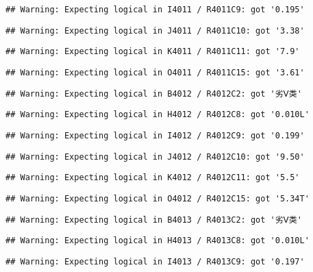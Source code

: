 \documentclass[
]{article}
\begin{document}
\begin{verbatim}
## Warning: Expecting logical in I4011 / R4011C9: got '0.195'
\end{verbatim}

\begin{verbatim}
## Warning: Expecting logical in J4011 / R4011C10: got '3.38'
\end{verbatim}

\begin{verbatim}
## Warning: Expecting logical in K4011 / R4011C11: got '7.9'
\end{verbatim}

\begin{verbatim}
## Warning: Expecting logical in O4011 / R4011C15: got '3.61'
\end{verbatim}

\begin{verbatim}
## Warning: Expecting logical in B4012 / R4012C2: got '劣Ⅴ类'
\end{verbatim}

\begin{verbatim}
## Warning: Expecting logical in H4012 / R4012C8: got '0.010L'
\end{verbatim}

\begin{verbatim}
## Warning: Expecting logical in I4012 / R4012C9: got '0.199'
\end{verbatim}

\begin{verbatim}
## Warning: Expecting logical in J4012 / R4012C10: got '9.50'
\end{verbatim}

\begin{verbatim}
## Warning: Expecting logical in K4012 / R4012C11: got '5.5'
\end{verbatim}

\begin{verbatim}
## Warning: Expecting logical in O4012 / R4012C15: got '5.34T'
\end{verbatim}

\begin{verbatim}
## Warning: Expecting logical in B4013 / R4013C2: got '劣Ⅴ类'
\end{verbatim}

\begin{verbatim}
## Warning: Expecting logical in H4013 / R4013C8: got '0.010L'
\end{verbatim}

\begin{verbatim}
## Warning: Expecting logical in I4013 / R4013C9: got '0.197'
\end{verbatim}
\end{document}
